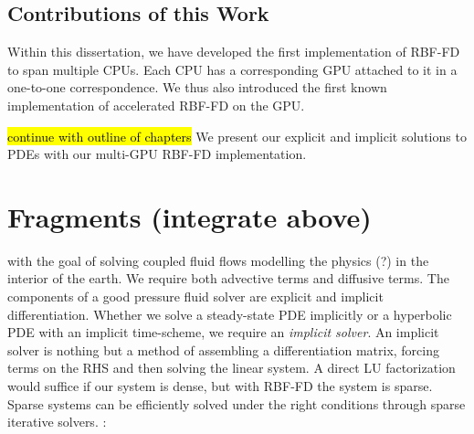 \section{ Contributions of this Work }

Within this dissertation, we have developed the first implementation of RBF-FD
to span multiple CPUs. Each CPU has a corresponding GPU attached to it
in a one-to-one correspondence. We thus also introduced the first known 
implementation of accelerated RBF-FD on the GPU.

 \hl{continue with outline of chapters} 
We present our explicit and implicit solutions to PDEs with our multi-GPU RBF-FD implementation. 


\chapter{Fragments (integrate above) }

with the goal of solving coupled fluid flows modelling the physics (?) in the interior of the earth. We require both advective terms and diffusive terms. The components of a good pressure fluid solver are explicit and implicit differentiation. Whether we solve a steady-state PDE implicitly or a hyperbolic PDE with an implicit time-scheme, we require an \emph{implicit solver}. An implicit solver is nothing but a method of assembling a differentiation matrix, forcing terms on the RHS and then solving the linear system. A direct LU factorization would suffice if our system is dense, but with RBF-FD the system is sparse. Sparse systems can be efficiently solved under the right conditions through sparse iterative solvers. :


